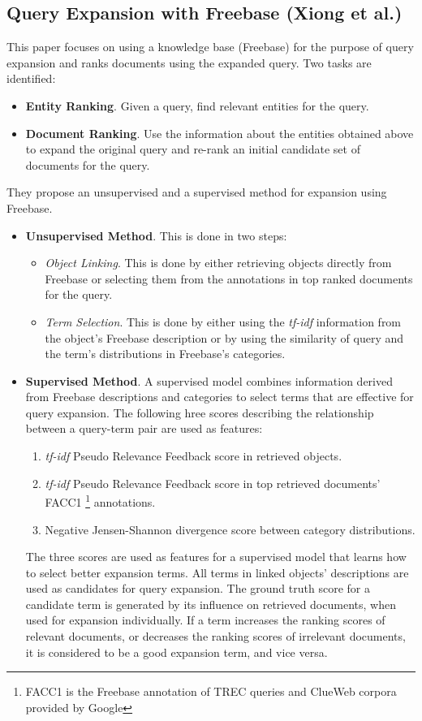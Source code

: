 \documentclass{article}
\begin{document}
\subsection{Query Expansion with Freebase (Xiong et al.\cite{xiong2015query})}
\label{subsec:query expansion with freebase}

This paper focuses on using a knowledge base (Freebase) for the purpose of query expansion and ranks documents using the expanded query. Two tasks are identified:
\begin{itemize}
    \item \textbf{Entity Ranking}. Given a query,  find relevant entities for the query.
    \item \textbf{Document Ranking}. Use the information about the entities obtained above to expand the original query and re-rank an initial candidate set of documents for the query.
\end{itemize}
They propose an unsupervised and a supervised method for expansion using Freebase. 
\begin{itemize}
    \item \textbf{Unsupervised Method}. This is done in two steps:
    \begin{itemize}
        \item \textit{Object Linking}. This is done by either retrieving objects directly from Freebase or selecting them from the annotations in top ranked documents for the query.
        \item \textit{Term Selection}. This is done by either using the \textit{tf-idf} information from the object's Freebase description or by using the similarity of query and the term’s distributions in Freebase’s categories. 
    \end{itemize}
    \item \textbf{Supervised Method}. A supervised model combines information derived from Freebase descriptions and categories to select terms that are effective for query expansion. The following hree scores describing the relationship between a query-term pair are used as features:
    \begin{enumerate}
        \item \textit{tf-idf} Pseudo Relevance Feedback score in retrieved objects.
        \item \textit{tf-idf} Pseudo Relevance Feedback score in top retrieved documents’ FACC1 \footnote{FACC1 is the Freebase annotation of TREC queries and ClueWeb corpora provided by Google} annotations.
        \item Negative Jensen-Shannon divergence score between category distributions.
    \end{enumerate}
    The three scores are used as features for a supervised model that learns how to select better expansion terms. All terms in linked objects’ descriptions are used as candidates for query expansion. The ground truth score for a candidate term is generated by its influence on retrieved documents, when used for expansion individually. If a term increases the ranking scores of relevant documents, or decreases the ranking scores of irrelevant documents, it is considered to be a good expansion term, and vice versa.
\end{itemize}
\end{document}

